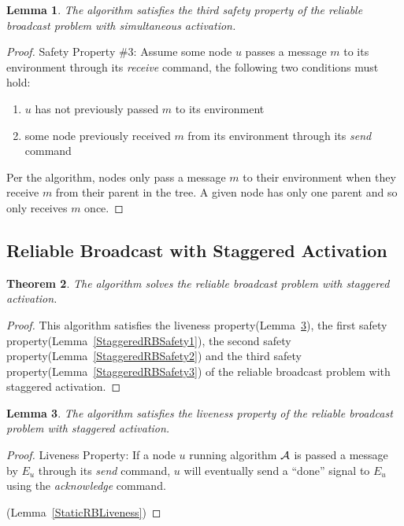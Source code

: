 \documentclass[english]{article}
\newtheorem{theorem}{Theorem}[section]
\newtheorem{lemma}[theorem]{Lemma}
\begin{document}
\begin{lemma}
\label{StaticRBSafety3}
The algorithm satisfies the third safety property of the reliable broadcast problem with simultaneous activation.
\end{lemma}
\begin{proof}
Safety Property \#3: Assume some node $u$ passes a message $m$ to its environment through its \textit{receive} command, the following two conditions must hold:
  \begin {enumerate}
    \item $u$ has not previously passed $m$ to its environment
    \item some node previously received $m$ from its environment through its \textit{send} command
  \end{enumerate}

Per the algorithm, nodes only pass a message $m$ to their environment when they receive $m$ from their parent in the tree. A given node has only one parent and so only receives $m$ once.
\end{proof}




\subsection {Reliable Broadcast with Staggered Activation}

\begin{theorem}
\label{StaggeredReliableBroadcast}
The algorithm solves the reliable broadcast problem with staggered activation.
\end{theorem}
\begin{proof}
This algorithm satisfies the liveness property(Lemma~\ref{StaggeredRBLiveness}), 
the first safety property(Lemma~\ref{StaggeredRBSafety1}),
the second safety property(Lemma~\ref{StaggeredRBSafety2}) and 
the third safety property(Lemma~\ref{StaggeredRBSafety3}) of the reliable broadcast problem with staggered activation.
\end{proof}

\begin{lemma}
\label{StaggeredRBLiveness}
The algorithm satisfies the liveness property of the reliable broadcast problem with staggered activation.
\end{lemma}
\begin{proof}
Liveness Property: If a node $u$ running algorithm $\cal A$ is passed a message by $E_u$ through its \textit{send} command, $u$ will eventually send  a ``done'' signal to $E_u$ using the \textit{acknowledge} command.

(Lemma~\ref{StaticRBLiveness})
\end{proof}
\end{document}
